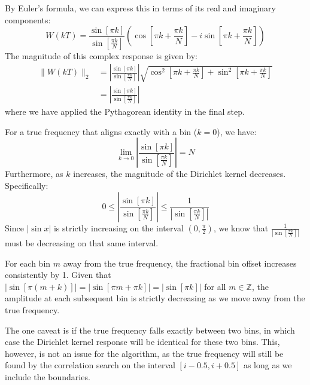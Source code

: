 \documentclass[11pt,twoside]{report}
\numberwithin{thm}{section}
\numberwithin{equation}{section}
\begin{document}
By Euler's formula, we can express this in terms of its real and imaginary components:
\begin{equation}
\label{eq:dirichlet_complex}
W(kT) = \frac{\sin\left[\pi k\right]}{\sin\left[\frac{\pi k}{N}\right]}\left(\cos\left[\pi k + \frac{\pi k}{N}\right] - i\sin\left[\pi k + \frac{\pi k}{N}\right]\right)
\end{equation}
The magnitude of this complex response is given by:
\begin{align}
\label{eq:dirichlet_magnitude}
\|W(kT)\|_2 &= \left|\frac{\sin\left[\pi k\right]}{\sin\left[\frac{\pi k}{N}\right]}\right| \sqrt{\cos^2\left[\pi k + \frac{\pi k}{N}\right] + \sin^2\left[\pi k + \frac{\pi k}{N}\right]} \\
&= \left|\frac{\sin\left[\pi k\right]}{\sin\left[\frac{\pi k}{N}\right]}\right|
\end{align}
where we have applied the Pythagorean identity in the final step.

For a true frequency that aligns exactly with a bin ($k = 0$), we have:
\begin{equation}
\label{eq:dirichlet_at_zero}
\lim_{k\to 0} \left|\frac{\sin\left[\pi k\right]}{\sin\left[\frac{\pi k}{N}\right]}\right| = N
\end{equation}
Furthermore, as $k$ increases, the magnitude of the Dirichlet kernel decreases. Specifically:
\begin{equation}
\label{eq:dirichlet_bounds}
0 \leq \left|\frac{\sin\left[\pi k\right]}{\sin\left[\frac{\pi k}{N}\right]}\right| \leq \frac{1}{\left|\sin\left[\frac{\pi k}{N}\right]\right|}
\end{equation}
Since $|\sin x|$ is strictly increasing on the interval $(0, \frac{\pi}{2})$, we know that $\frac{1}{\left|\sin\left[\frac{\pi k}{N}\right]\right|}$ must be decreasing on that same interval.

For each bin $m$ away from the true frequency, the fractional bin offset increases consistently by 1. Given that $|\sin[\pi(m + k)]| = |\sin[\pi m + \pi k]| = |\sin[\pi k]|$ for all $m \in \mathbb{Z}$, the amplitude at each subsequent bin is strictly decreasing as we move away from the true frequency.

The one caveat is if the true frequency falls exactly between two bins, in which case the Dirichlet kernel response will be identical for these two bins. This, however, is not an issue for the algorithm, as the true frequency will still be found by the correlation search on the interval $[i-0.5, i+0.5]$ as long as we include the boundaries.
\clearpage
\end{document}
